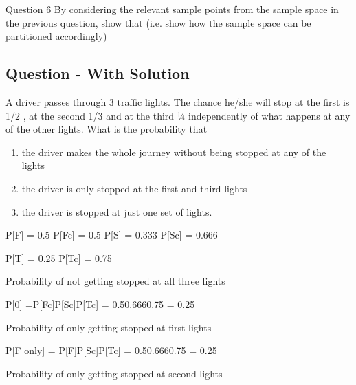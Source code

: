 
Question 6
By considering the relevant sample points from the sample space in the previous question, show that 
(i.e. show how the sample space can be partitioned accordingly)












\subsection{Question - With Solution}


A driver passes through 3 traffic lights. The chance he/she will stop at the first is 1/2 , at the second 1/3 and at the third ¼ independently of what happens at any of the other lights. What is the probability that

\begin{enumerate}
\item    the driver makes the whole journey without being stopped at any of the lights

\item   the driver is only stopped at the first and third lights

\item  the driver is stopped at just one set of lights.
\end{enumerate}

P[F] = 0.5           P[Fc] = 0.5            P[S] = 0.333        P[Sc] = 0.666

P[T] = 0.25         P[Tc] = 0.75





Probability of not getting stopped at all three lights


P[0] =P[Fc]P[Sc]P[Tc] = 0.50.6660.75 = 0.25



Probability of only getting stopped at first  lights


P[F only] = P[F]P[Sc]P[Tc] = 0.50.6660.75 = 0.25


Probability of only getting stopped at second lights


